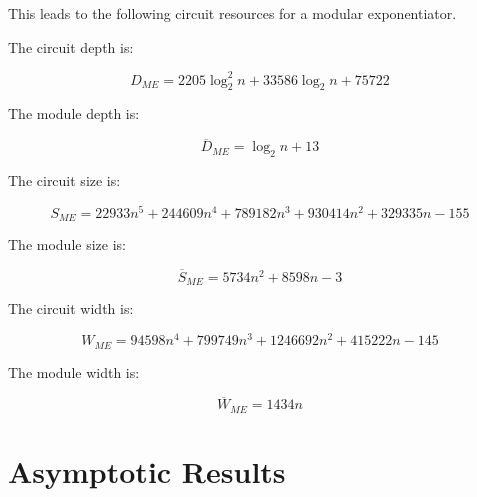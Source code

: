 \documentclass[twoside]{article}
\begin{document}
This leads to the following circuit resources for a modular exponentiator.

The circuit depth is:

\begin{equation}
D_{ME} = 2205\log_2^2 n + 33586\log_2 n + 75722
\end{equation}

The module depth is:

\begin{equation}
\overline{D}_{ME} = \log_2 n + 13
\end{equation}

The circuit size is:

\begin{equation}
S_{ME} = 22933n^5 + 244609n^4 + 789182n^3 + 930414n^2 + 329335n - 155
\end{equation}

The module size is:

\begin{equation}
\overline{S}_{ME} = 5734n^2 + 8598n - 3
\end{equation}

The circuit width is:

\begin{equation}
W_{ME} = 94598n^4 + 799749 n^3 + 1246692 n^2 + 415222 n - 145
\end{equation}

The module width is:

\begin{equation}
\overline{W}_{ME} = 1434n
\end{equation}

%
\section{Asymptotic Results}
\label{sec:results}
\end{document}
